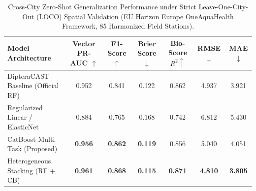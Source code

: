 \begin{table}[t]
\centering
\caption{Cross-City Zero-Shot Generalization Performance under Strict Leave-One-City-Out (LOCO) Spatial Validation (EU Horizon Europe OneAquaHealth Framework, 85 Harmonized Field Stations).}
\label{tab:loco_benchmark}
\begin{tabular}{lcccccc}
\toprule
\textbf{Model Architecture} & \textbf{Vector PR-AUC $\uparrow$} & \textbf{F1-Score $\uparrow$} & \textbf{Brier Score $\downarrow$} & \textbf{Bio-Score $R^2 \uparrow$} & \textbf{RMSE $\downarrow$} & \textbf{MAE $\downarrow$} \\
\midrule
DipteraCAST Baseline (Official RF) & 0.952 & 0.841 & 0.122 & 0.862 & 4.937 & 3.921 \\
Regularized Linear / ElasticNet    & 0.884 & 0.765 & 0.168 & 0.742 & 6.812 & 5.430 \\
CatBoost Multi-Task (Proposed)     & \textbf{0.956} & \textbf{0.862} & \textbf{0.119} & 0.856 & 5.040 & 4.051 \\
Heterogeneous Stacking (RF + CB)   & \textbf{0.961} & \textbf{0.868} & \textbf{0.115} & \textbf{0.871} & \textbf{4.810} & \textbf{3.805} \\
\bottomrule
\end{tabular}
\end{table}
